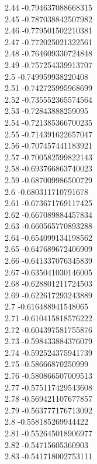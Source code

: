 {2.44	-0.794637088668315\\
2.45	-0.787038842507982\\
2.46	-0.779501502210381\\
2.47	-0.772025021322561\\
2.48	-0.764609330724848\\
2.49	-0.757254339913707\\
2.5	-0.749959938220408\\
2.51	-0.742725995968699\\
2.52	-0.735552365574564\\
2.53	-0.72843888259095\\
2.54	-0.721385366700235\\
2.55	-0.714391622657047\\
2.56	-0.707457441183921\\
2.57	-0.700582599822143\\
2.58	-0.693766863740023\\
2.59	-0.687009986500729\\
2.6	-0.680311710791678\\
2.61	-0.673671769117425\\
2.62	-0.667089884457834\\
2.63	-0.660565770893288\\
2.64	-0.654099134198562\\
2.65	-0.647689672406909\\
2.66	-0.641337076345839\\
2.67	-0.635041030146005\\
2.68	-0.628801211724503\\
2.69	-0.622617293243889\\
2.7	-0.616488941548065\\
2.71	-0.610415818576222\\
2.72	-0.604397581755876\\
2.73	-0.598433884376079\\
2.74	-0.592524375941739\\
2.75	-0.58666870250999\\
2.76	-0.580866507009513\\
2.77	-0.575117429543608\\
2.78	-0.569421107677857\\
2.79	-0.563777176713092\\
2.8	-0.558185269944422\\
2.81	-0.552645018906977\\
2.82	-0.54715605360903\\
2.83	-0.541718002753111\\
}
